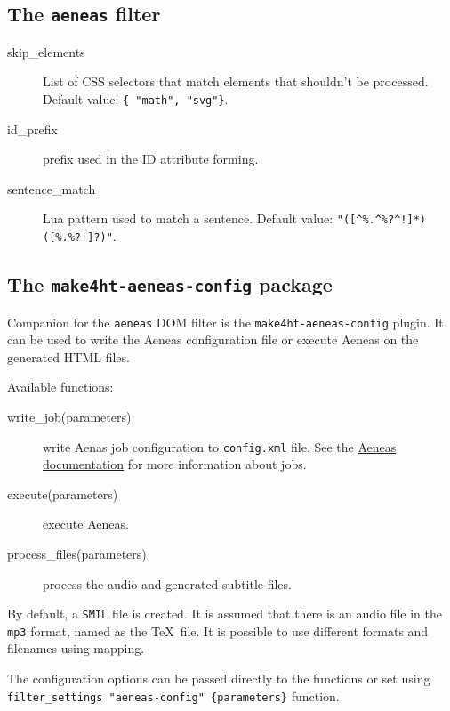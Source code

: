 \hypertarget{the-aeneas-filter}{%
\subsection{\texorpdfstring{The \texttt{aeneas}
filter}{The aeneas filter}}\label{the-aeneas-filter}}

\begin{description}
\item[skip\_elements]
List of CSS selectors that match elements that shouldn't be processed.
Default value: \texttt{\{\ "math",\ "svg"\}}.
\item[id\_prefix]
prefix used in the ID attribute forming.
\item[sentence\_match]
Lua pattern used to match a sentence. Default value:
\texttt{"({[}\^{}\%.\^{}\%?\^{}!{]}*)({[}\%.\%?!{]}?)"}.
\end{description}

\hypertarget{the-make4ht-aeneas-config-package}{%
\subsection{\texorpdfstring{The \texttt{make4ht-aeneas-config}
package}{The make4ht-aeneas-config package}}\label{the-make4ht-aeneas-config-package}}

Companion for the \texttt{aeneas} DOM filter is the
\texttt{make4ht-aeneas-config} plugin. It can be used to write the
Aeneas configuration file or execute Aeneas on the generated HTML files.

Available functions:

\begin{description}
\item[write\_job(parameters)]
write Aenas job configuration to \texttt{config.xml} file. See the
\href{https://www.readbeyond.it/aeneas/docs/clitutorial.html\#processing-jobs}{Aeneas
documentation} for more information about jobs.
\item[execute(parameters)]
execute Aeneas.
\item[process\_files(parameters)]
process the audio and generated subtitle files.
\end{description}

By default, a \texttt{SMIL} file is created. It is assumed that there is
an audio file in the \texttt{mp3} format, named as the \TeX~file. It is
possible to use different formats and filenames using mapping.

The configuration options can be passed directly to the functions or set
using \texttt{filter\_settings\ "aeneas-config"\ \{parameters\}}
function.

